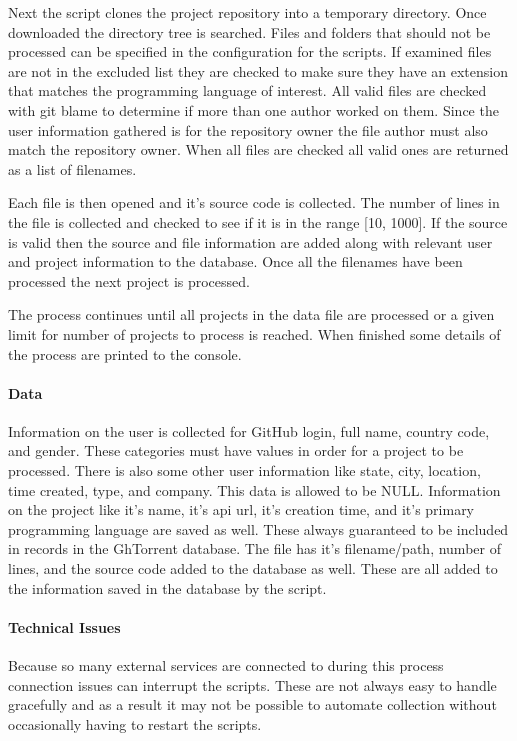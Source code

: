 \documentclass{article}
\begin{document}
Next the script clones the project repository into a temporary directory. Once downloaded the directory tree is searched. Files and folders that should not be processed can be specified in the configuration for the scripts. If examined files are not in the excluded list they are checked to make sure they have an extension that matches the programming language of interest. All valid files are checked with git blame to determine if more than one author worked on them. Since the user information gathered is for the repository owner the file author must also match the repository owner. When all files are checked all valid ones are returned as a list of filenames.

Each file is then opened and it's source code is collected. The number of lines in the file is collected and checked to see if it is in the range [10, 1000]. If the source is valid then the source and file information are added along with relevant user and project information to the database. Once all the filenames have been processed the next project is processed.

The process continues until all projects in the data file are processed or a given limit for number of projects to process is reached. When finished some details of the process are printed to the console.

\paragraph{Data}
Information on the user is collected for GitHub login, full name, country code, and gender. These categories must have values in order for a project to be processed. There is also some other user information like state, city, location, time created, type, and company. This data is allowed to be NULL. Information on the project like it's name, it's api url, it's creation time, and it's primary programming language are saved as well. These always guaranteed to be included in records in the GhTorrent database. The file has it's filename/path, number of lines, and the source code added to the database as well. These are all added to the information saved in the database by the script.

\paragraph{Technical Issues}
Because so many external services are connected to during this process connection issues can interrupt the scripts. These are not always easy to handle gracefully and as a result it may not be possible to automate collection without occasionally having to restart the scripts.
\end{document}
